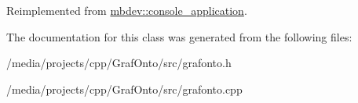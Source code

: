 \-Reimplemented from \hyperlink{classmbdev_1_1console__application}{mbdev\-::console\-\_\-application}.



\-The documentation for this class was generated from the following files\-:\begin{DoxyCompactItemize}
\item 
/media/projects/cpp/\-Graf\-Onto/src/grafonto.\-h\item 
/media/projects/cpp/\-Graf\-Onto/src/grafonto.\-cpp\end{DoxyCompactItemize}
